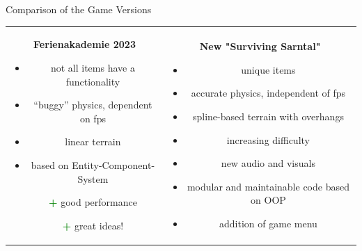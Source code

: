 \begin{frame}{Comparison of the Game Versions}
    \centering
    \begin{tabular}{cc}
        \begin{tcolorbox}[colback=boxcolor, width=0.5\textwidth, height=6.5cm, colframe=boxcolor, rounded corners]
            \textbf{Ferienakademie 2023}
            \begin{itemize}
                \setbeamertemplate{itemize item}{\textcolor{red}{\textbf{-}}}
                \item not all items have a functionality
                \item ``buggy'' physics, dependent on fps
                \item linear terrain
                \item based on Entity-Component-System
                \item[\textcolor{green}{\textbf{+}}] good performance
                \item[\textcolor{green}{\textbf{+}}] great ideas!
            \end{itemize}
        \end{tcolorbox}
        &
        \begin{tcolorbox}[colback=boxcolor, width=0.5\textwidth, height=6.5cm, colframe=boxcolor, rounded corners]
            \textbf{New "Surviving Sarntal"}
            \begin{itemize}
                \setbeamertemplate{itemize item}{\textcolor{green}{\textbf{+}}}
                \item unique items
                \item accurate physics, independent of fps
                \item spline-based terrain with overhangs
                \item increasing difficulty
                \item new audio and visuals 
                \item modular and maintainable code based on OOP
                \item addition of game menu
            \end{itemize}
        \end{tcolorbox}
    \end{tabular}
\end{frame}

